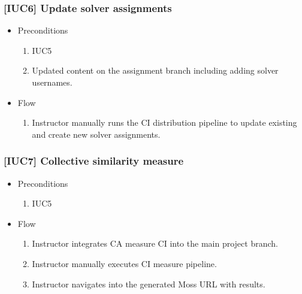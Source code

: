 \subsubsection{{[}IUC6{]} Update solver assignments}

\begin{itemize}
\item
  {Preconditions}
    \begin{enumerate}
    \item
      {IUC5}
    \item
      {Updated content on the assignment branch including adding solver usernames.}
    \end{enumerate}
\end{itemize}

\begin{itemize}
\item
  {Flow}
    \begin{enumerate}
    \item
      {Instructor manually runs the CI distribution pipeline to update existing and create new solver assignments.}
    \end{enumerate}
\end{itemize}

\subsubsection{{[}IUC7{]} Collective similarity measure}

\begin{itemize}
\item
  {Preconditions}
    \begin{enumerate}
    \item
      {IUC5}
    \end{enumerate}
\end{itemize}

\begin{itemize}
\item
  {Flow}
    \begin{enumerate}
    \item
      {Instructor integrates CA measure CI into the main project branch.}
    \item
      {Instructor manually executes CI measure pipeline.}
    \item
      {Instructor navigates into the generated Moss URL with results.}
    \end{enumerate}
\end{itemize}

